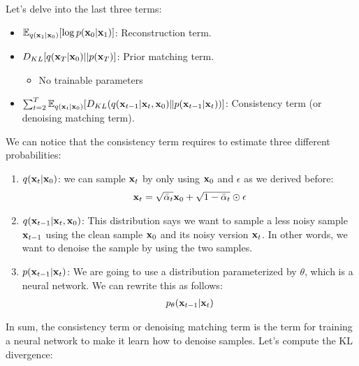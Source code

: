 Let's delve into the last three terms:
\begin{itemize}
	\item $\mathbb{E}_{q({\mathbf{x}}_{1}|{\mathbf{x}}_0)}[\log p({\mathbf{x}}_0|{\mathbf{x}}_{1})]$: Reconstruction term. 
	\item $D_{KL} [ q({\mathbf{x}}_{T}|{\mathbf{x}}_0)||p({\mathbf{x}}_T) ]$: Prior matching term.
		\begin{itemize}
			\item No trainable parameters 
		\end{itemize}
	\item $\sum_{t=2}^{T}\mathbb{E}_{q({\mathbf{x}}_{t}|{\mathbf{x}}_0)}[D_{KL}(q({\mathbf{x}}_{t-1}|{\mathbf{x}}_t, {\mathbf{x}}_0)\|p({\mathbf{x}}_{t-1}|{\mathbf{x}}_{t}))]$: Consistency term (or denoising matching term).
\end{itemize}
We can notice that the consistency term requires to estimate three different probabilities:
\begin{enumerate}
	\item $q({\mathbf{x}}_{t}|{\mathbf{x}}_0)$: we can sample ${\mathbf{x}}_t$ by only using ${\mathbf{x}}_0$ and $\epsilon$ as we derived before: 
		\begin{align*}
			{\mathbf{x}}_t = \sqrt{\bar{\alpha}_t} \mathbf{x}_{0}+ \sqrt{1-\bar{\alpha}_t} \odot \epsilon
		\end{align*}
	\item $q({\mathbf{x}}_{t-1}|{\mathbf{x}}_t, {\mathbf{x}}_0)$: This distribution says we want to sample a less noisy sample ${\mathbf{x}}_{t-1}$ using the clean sample ${\mathbf{x}}_0$ and its noisy version ${\mathbf{x}}_t$. In other words, we want to denoise the sample by using the two samples. 
	\item $p({\mathbf{x}}_{t-1}|{\mathbf{x}}_{t})$: We are going to use a distribution parameterized by $\theta$, which is a neural network. We can rewrite this as follows:
		\begin{align*}
			p_\theta({\mathbf{x}}_{t-1}|{\mathbf{x}}_{t})
		\end{align*}
\end{enumerate}
In sum, the consistency term or denoising matching term is the term for training a neural network to make it learn how to denoise samples. Let's compute the KL divergence:

